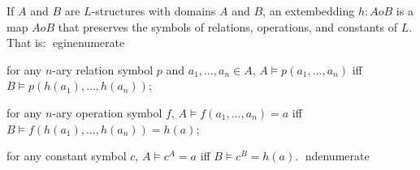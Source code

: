 If $A$ and $B$ are $L$-structures with domains $A$ and $B$, an 	ext{embedding} $h : A 	o B$ is a map $A 	o B$ that preserves the symbols of relations, operations, and constants of $L$. That is:
egin{enumerate}
\item[(i)] for any $n$-ary relation symbol $p$ and $a_1,\ldots,a_n \in A$, $A \models p(a_1,\ldots,a_n)$ iff $B \models p(h(a_1),\ldots,h(a_n))$;
\item[(ii)] for any $n$-ary operation symbol $f$, $A \models f(a_1,\ldots,a_n)=a$ iff $B \models f(h(a_1),\ldots,h(a_n))=h(a)$;
\item[(iii)] for any constant symbol $c$, $A \models c^A = a$ iff $B \models c^B = h(a)$.
nd{enumerate}
